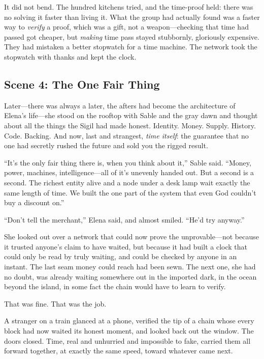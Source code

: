 It did not bend. The hundred kitchens tried, and the time-proof held: there was no
solving it faster than living it. What the group had actually found was a faster way
to \emph{verify} a proof, which was a gift, not a weapon---checking that time had
passed got cheaper, but \emph{making} time pass stayed stubbornly, gloriously
expensive. They had mistaken a better stopwatch for a time machine. The network
took the stopwatch with thanks and kept the clock.

\hypertarget{scene-4-the-one-fair-thing}{%
\subsection{Scene 4: The One Fair
Thing}\label{scene-4-the-one-fair-thing}}

Later---there was always a later, the afters had become the architecture of
Elena's life---she stood on the rooftop with Sable and the gray dawn and thought
about all the things the Sigil had made honest. Identity. Money. Supply. History.
Code. Backing. And now, last and strangest, \emph{time itself}: the guarantee that
no one had secretly rushed the future and sold you the rigged result.

``It's the only fair thing there is, when you think about it,'' Sable said. ``Money,
power, machines, intelligence---all of it's unevenly handed out. But a second is a
second. The richest entity alive and a node under a desk lamp wait exactly the same
length of time. We built the one part of the system that even God couldn't buy a
discount on.''

``Don't tell the merchant,'' Elena said, and almost smiled. ``He'd try anyway.''

She looked out over a network that could now prove the unprovable---not because it
trusted anyone's claim to have waited, but because it had built a clock that could
only be read by truly waiting, and could be checked by anyone in an instant. The
last seam money could reach had been sewn. The next one, she had no doubt, was
already waiting somewhere out in the imported dark, in the ocean beyond the island,
in some fact the chain would have to learn to verify.

That was fine. That was the job.

A stranger on a train glanced at a phone, verified the tip of a chain whose every
block had now waited its honest moment, and looked back out the window. The doors
closed. Time, real and unhurried and impossible to fake, carried them all forward
together, at exactly the same speed, toward whatever came next.

